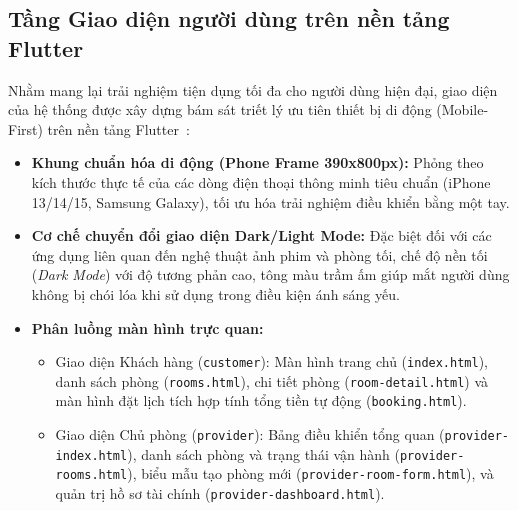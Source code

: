 \subsection{Tầng Giao diện người dùng trên nền tảng Flutter}
Nhằm mang lại trải nghiệm tiện dụng tối đa cho người dùng hiện đại, giao diện của hệ thống được xây dựng bám sát triết lý ưu tiên thiết bị di động (Mobile-First) trên nền tảng Flutter~\cite{alzewairi2024critical}:
\begin{itemize}[leftmargin=2em]
    \item \textbf{Khung chuẩn hóa di động (Phone Frame 390x800px):} Phỏng theo kích thước thực tế của các dòng điện thoại thông minh tiêu chuẩn (iPhone 13/14/15, Samsung Galaxy), tối ưu hóa trải nghiệm điều khiển bằng một tay.
    \item \textbf{Cơ chế chuyển đổi giao diện Dark/Light Mode:} Đặc biệt đối với các ứng dụng liên quan đến nghệ thuật ảnh phim và phòng tối, chế độ nền tối (\textit{Dark Mode}) với độ tương phản cao, tông màu trầm ấm giúp mắt người dùng không bị chói lóa khi sử dụng trong điều kiện ánh sáng yếu.
    \item \textbf{Phân luồng màn hình trực quan:}
    \begin{itemize}
        \item Giao diện Khách hàng (\texttt{customer}): Màn hình trang chủ (\texttt{index.html}), danh sách phòng (\texttt{rooms.html}), chi tiết phòng (\texttt{room-detail.html}) và màn hình đặt lịch tích hợp tính tổng tiền tự động (\texttt{booking.html}).
        \item Giao diện Chủ phòng (\texttt{provider}): Bảng điều khiển tổng quan (\texttt{provider-index.html}), danh sách phòng và trạng thái vận hành (\texttt{provider-rooms.html}), biểu mẫu tạo phòng mới (\texttt{provider-room-form.html}), và quản trị hồ sơ tài chính (\texttt{provider-dashboard.html}).
    \end{itemize}
\end{itemize}
